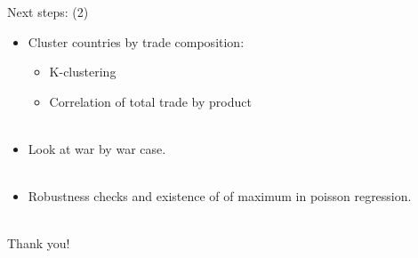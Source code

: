 \documentclass[11pt]{beamer}
\begin{document}
\begin{frame}{Next steps: (2)}
\begin{itemize}

\item{Cluster countries by trade composition:}
\begin{itemize}
\item{K-clustering}
\item{Correlation of total trade by product}\\~\\
\end{itemize}
\item{Look at war by war case. }\\~\\
\item{Robustness checks and existence of of maximum in poisson regression.}\\~\\

\end{itemize}
\end{frame}

\begin{frame}
\begin{center}
\Huge{Thank you!}
\end{center}

\end{frame}
\end{document}
